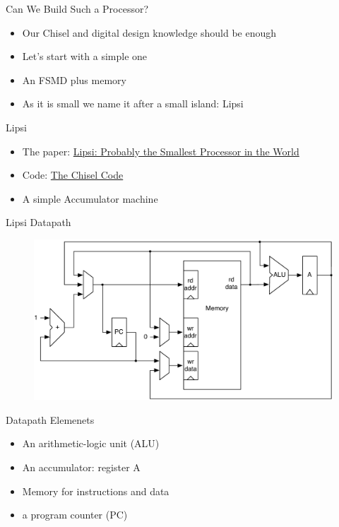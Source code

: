 \begin{frame}[fragile]{Can We Build Such a Processor?}
\begin{itemize}
\item Our Chisel and digital design knowledge should be enough
\item Let's start with a simple one
\item An FSMD plus memory
\item As it is small we  name it after a small island: Lipsi
\end{itemize}
\end{frame}

\begin{frame}[fragile]{Lipsi}
\begin{itemize}
\item The paper: \href{https://www.jopdesign.com/doc/lipsi.pdf}{Lipsi: Probably the Smallest Processor in the World}
\item Code: \href{https://github.com/schoeberl/lipsi}{The Chisel Code}
\item A simple Accumulator machine
\end{itemize}
\end{frame}


\begin{frame}[fragile]{Lipsi Datapath}
\begin{figure}
  \includegraphics[scale=0.5]{../figures/lipsi}
\end{figure}
\end{frame}

\begin{frame}[fragile]{Datapath Elemenets}
\begin{itemize}
\item An arithmetic-logic unit (ALU)
\item An accumulator: register A
\item Memory for instructions and data
\item a program counter (PC)
\end{itemize}
\end{frame}

